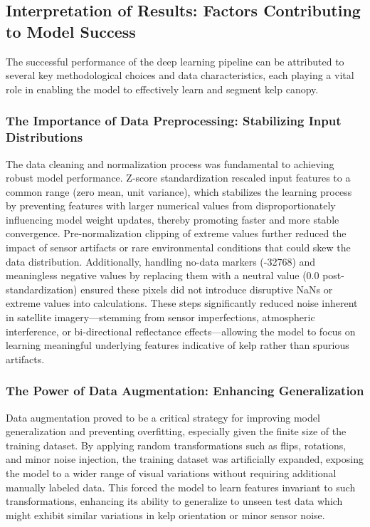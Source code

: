 \documentclass{article}
\begin{document}
\subsection{Interpretation of Results: Factors Contributing to Model Success}

The successful performance of the deep learning pipeline can be attributed to several key methodological choices and data characteristics, each playing a vital role in enabling the model to effectively learn and segment kelp canopy.

\subsubsection{The Importance of Data Preprocessing: Stabilizing Input Distributions}

The data cleaning and normalization process was fundamental to achieving robust model performance. Z-score standardization rescaled input features to a common range (zero mean, unit variance), which stabilizes the learning process by preventing features with larger numerical values from disproportionately influencing model weight updates, thereby promoting faster and more stable convergence. Pre-normalization clipping of extreme values further reduced the impact of sensor artifacts or rare environmental conditions that could skew the data distribution. Additionally, handling no-data markers (-32768) and meaningless negative values by replacing them with a neutral value (0.0 post-standardization) ensured these pixels did not introduce disruptive NaNs or extreme values into calculations. These steps significantly reduced noise inherent in satellite imagery—stemming from sensor imperfections, atmospheric interference, or bi-directional reflectance effects—allowing the model to focus on learning meaningful underlying features indicative of kelp rather than spurious artifacts.

\subsubsection{The Power of Data Augmentation: Enhancing Generalization}

Data augmentation proved to be a critical strategy for improving model generalization and preventing overfitting, especially given the finite size of the training dataset. By applying random transformations such as flips, rotations, and minor noise injection, the training dataset was artificially expanded, exposing the model to a wider range of visual variations without requiring additional manually labeled data. This forced the model to learn features invariant to such transformations, enhancing its ability to generalize to unseen test data which might exhibit similar variations in kelp orientation or minor sensor noise. 
\end{document}
